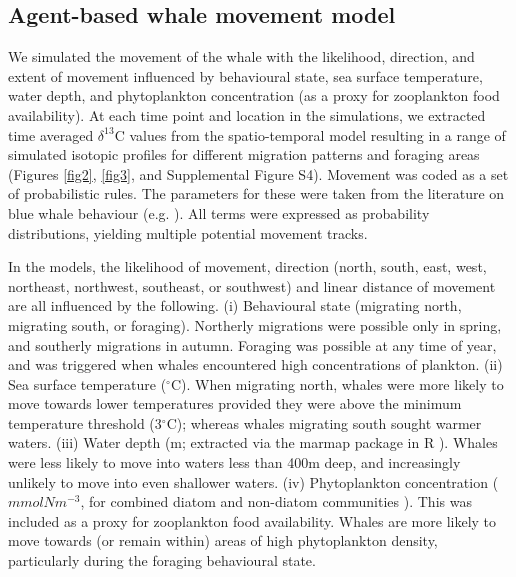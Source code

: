 \documentclass[9pt,twocolumn,twoside,lineno]{pnas-new}
\begin{document}
{\subsection*{Agent-based whale movement model}
We simulated the movement of the whale with the likelihood, direction, and extent of movement influenced by behavioural state, sea surface temperature, water depth, and phytoplankton concentration (as a proxy for zooplankton food availability). 
At each time point and location in the simulations, we extracted time averaged $\delta^{13}$C values from the spatio-temporal model \cite{magozzi2017using} resulting in a range of simulated isotopic profiles for different migration patterns and foraging areas (Figures \ref{fig2}, \ref{fig3}, and Supplemental Figure S4). 
Movement was coded as a set of probabilistic rules. 
The parameters for these were taken from the literature on blue whale behaviour (e.g. \cite{handbook}). 
All terms were expressed as probability distributions, yielding multiple potential movement tracks. 
 
In the models, the likelihood of movement, direction (north, south, east, west, northeast, northwest, southeast, or southwest) and linear distance of movement are all influenced by the following. 
(i) Behavioural state (migrating north, migrating south, or foraging).
Northerly migrations were possible only in spring, and southerly migrations in autumn. 
Foraging was possible at any time of year, and was triggered when whales encountered high concentrations of plankton.
(ii) Sea surface temperature \cite{yool2013medusa} ($^{\circ}$C). 
When migrating north, whales were more likely to move towards lower temperatures provided they were above the minimum temperature threshold (3$^{\circ}$C); whereas whales migrating south sought warmer waters. 
(iii) Water depth \cite{bathy} (m; extracted via the marmap package in R \cite{marmap}). 
Whales were less likely to move into waters less than 400m deep, and increasingly unlikely to move into even shallower waters. 
(iv) Phytoplankton concentration ($mmolNm^{-3}$, for combined diatom and non-diatom communities \cite{yool2013medusa}). 
This was included as a proxy for zooplankton food availability. 
Whales are more likely to move towards (or remain within) areas of high phytoplankton density, particularly during the foraging behavioural state. 

}
\end{document}
